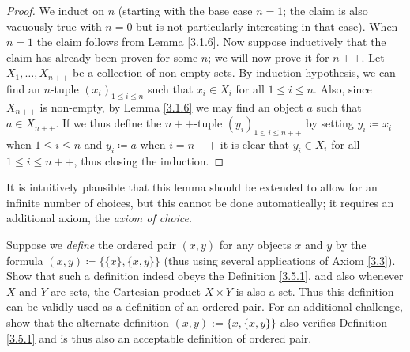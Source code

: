 \begin{proof}
We induct on \(n\) (starting with the base case \(n = 1\); the claim is also vacuously true with \(n = 0\) but is not particularly interesting in that case).
When \(n = 1\) the claim follows from Lemma \ref{3.1.6}.
Now suppose inductively that the claim has already been proven for some \(n\);
we will now prove it for \(n++\).
Let \(X_1, \dots, X_{n++}\) be a collection of non-empty sets.
By induction hypothesis, we can find an \(n\)-tuple \((x_i)_{1 \leq i \leq n}\) such that \(x_i \in X_i\) for all \(1 \leq i \leq n\).
Also, since \(X_{n++}\) is non-empty, by Lemma \ref{3.1.6} we may find an object \(a\) such that \(a \in X_{n++}\).
If we thus define the \(n++\)-tuple \((y_i)_{1 \leq i \leq n++}\) by setting \(y_i \coloneqq x_i\) when \(1 \leq i \leq n\) and \(y_i \coloneqq a\) when \(i = n++\) it is clear that \(y_i \in X_i\) for all \(1 \leq i \leq n++\), thus closing the induction.
\end{proof}

\begin{remark}\label{3.5.13}
It is intuitively plausible that this lemma should be extended to allow for an infinite number of choices, but this cannot be done automatically;
it requires an additional axiom, the \emph{axiom of choice}.
\end{remark}

\exercisesection

\begin{exercise}\label{ex 3.5.1}
Suppose we \emph{define} the ordered pair \((x, y)\) for any objects \(x\) and \(y\) by the formula \((x, y) \coloneqq \{\{x\}, \{x, y\}\}\)
(thus using several applications of Axiom \ref{3.3}).
Show that such a definition indeed obeys the Definition \ref{3.5.1}, and also whenever \(X\) and \(Y\) are sets, the Cartesian product \(X \times Y\) is also a set.
Thus this definition can be validly used as a definition of an ordered pair.
For an additional challenge, show that the alternate definition \((x, y) := \{x, \{x, y\}\}\) also verifies Definition \ref{3.5.1} and is thus also an acceptable definition of ordered pair.
\end{exercise}

